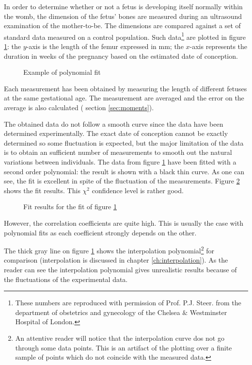 \documentclass[twoside]{book}
\begin{document}
In order to determine whether or not a fetus is developing itself
normally within the womb, the dimension of the fetus' bones are
measured during an ultrasound examination of the mother-to-be. The
dimensions are compared against a set of standard data measured on
a control population. Such data\footnote{These numbers are
reproduced with permission of Prof. P.J. Steer. from the
department of obstetrics and gynecology of the Chelsea $\&$
Westminster Hospital of London.} are plotted in figure
\ref{fig:femurLength}: the $y$-axis is the length of the femur
expressed in mm; the $x$-axis represents the duration in weeks of
the pregnancy based on the estimated date of conception.
\begin{figure}
\center{}
\caption{Example of polynomial fit} \label{fig:femurLength}
\end{figure}
Each measurement has been obtained by measuring the length of
different fetuses at the same gestational age. The measurement are
averaged and the error on the average is also calculated (\cf
section \ref{sec:moments}).

The obtained data do not follow a smooth curve since the data have
been determined experimentally. The exact date of conception
cannot be exactly determined so some fluctuation is expected, but
the major limitation of the data is to obtain an sufficient number
of measurements to smooth out the natural variations between
individuals. The data from figure \ref{fig:femurLength} have been
fitted with a second order polynomial: the result is shown with a
black thin curve. As one can see, the fit is excellent in spite of
the fluctuation of the measurements. Figure
\ref{fig:femurLengthResults} shows the fit results. This $\chi^2$
confidence level is rather good.
\begin{figure}[h]
\center{}
\caption{Fit results for the fit of figure \ref{fig:femurLength}
}\label{fig:femurLengthResults}
\end{figure}
However, the correlation coefficients are quite high. This is
usually the case with polynomial fits as each coefficient strongly
depends on the other.

The thick gray line on figure \ref{fig:femurLength} shows the
interpolation polynomial\footnote{An attentive reader will notice
that the interpolation curve dos not go through some data points.
This is an artifact of the plotting over a finite sample of points
which do not coincide with the measured data.} for comparison
(interpolation is discussed in chapter \ref{ch:interpolation}). As
the reader can see the interpolation polynomial gives unrealistic
results because of the fluctuations of the experimental data.
\end{document}
